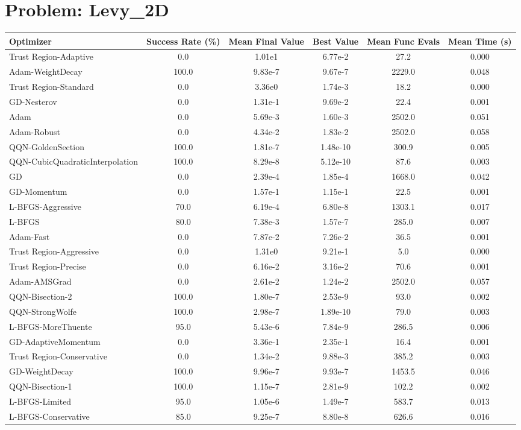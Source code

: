 \documentclass{article}
\begin{document}
\section{Problem: Levy\_2D}
\begin{longtable}{p{3cm}*{5}{c}}
\toprule
\textbf{Optimizer} & \textbf{Success Rate (\%)} & \textbf{Mean Final Value} & \textbf{Best Value} & \textbf{Mean Func Evals} & \textbf{Mean Time (s)} \\
\midrule
Trust Region-Adaptive & 0.0 & 1.01e1 & 6.77e-2 & 27.2 & 0.000 \\
Adam-WeightDecay & 100.0 & 9.83e-7 & 9.67e-7 & 2229.0 & 0.048 \\
Trust Region-Standard & 0.0 & 3.36e0 & 1.74e-3 & 18.2 & 0.000 \\
GD-Nesterov & 0.0 & 1.31e-1 & 9.69e-2 & 22.4 & 0.001 \\
Adam & 0.0 & 5.69e-3 & 1.60e-3 & 2502.0 & 0.051 \\
Adam-Robust & 0.0 & 4.34e-2 & 1.83e-2 & 2502.0 & 0.058 \\
QQN-GoldenSection & 100.0 & 1.81e-7 & 1.48e-10 & 300.9 & 0.005 \\
QQN-CubicQuadraticInterpolation & 100.0 & 8.29e-8 & 5.12e-10 & 87.6 & 0.003 \\
GD & 0.0 & 2.39e-4 & 1.85e-4 & 1668.0 & 0.042 \\
GD-Momentum & 0.0 & 1.57e-1 & 1.15e-1 & 22.5 & 0.001 \\
L-BFGS-Aggressive & 70.0 & 6.19e-4 & 6.80e-8 & 1303.1 & 0.017 \\
L-BFGS & 80.0 & 7.38e-3 & 1.57e-7 & 285.0 & 0.007 \\
Adam-Fast & 0.0 & 7.87e-2 & 7.26e-2 & 36.5 & 0.001 \\
Trust Region-Aggressive & 0.0 & 1.31e0 & 9.21e-1 & 5.0 & 0.000 \\
Trust Region-Precise & 0.0 & 6.16e-2 & 3.16e-2 & 70.6 & 0.001 \\
Adam-AMSGrad & 0.0 & 2.61e-2 & 1.24e-2 & 2502.0 & 0.057 \\
QQN-Bisection-2 & 100.0 & 1.80e-7 & 2.53e-9 & 93.0 & 0.002 \\
QQN-StrongWolfe & 100.0 & 2.98e-7 & 1.89e-10 & 79.0 & 0.003 \\
L-BFGS-MoreThuente & 95.0 & 5.43e-6 & 7.84e-9 & 286.5 & 0.006 \\
GD-AdaptiveMomentum & 0.0 & 3.36e-1 & 2.35e-1 & 16.4 & 0.001 \\
Trust Region-Conservative & 0.0 & 1.34e-2 & 9.88e-3 & 385.2 & 0.003 \\
GD-WeightDecay & 100.0 & 9.96e-7 & 9.93e-7 & 1453.5 & 0.046 \\
QQN-Bisection-1 & 100.0 & 1.15e-7 & 2.81e-9 & 102.2 & 0.002 \\
L-BFGS-Limited & 95.0 & 1.05e-6 & 1.49e-7 & 583.7 & 0.013 \\
L-BFGS-Conservative & 85.0 & 9.25e-7 & 8.80e-8 & 626.6 & 0.016 \\
\bottomrule
\end{longtable}
\end{document}
